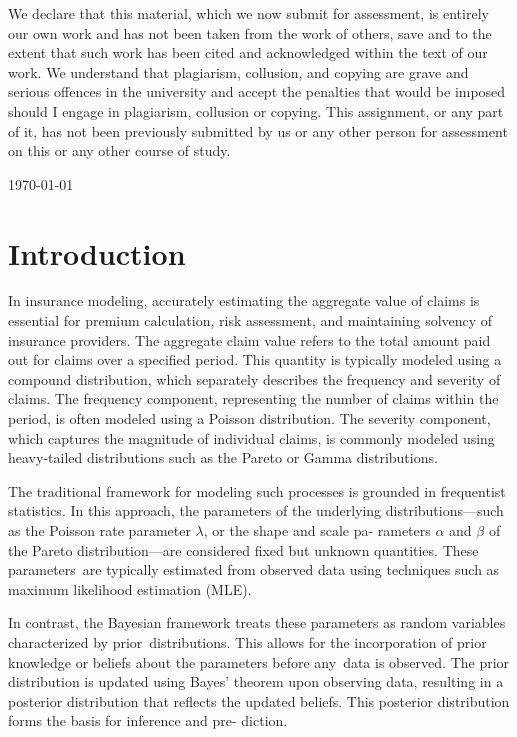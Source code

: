 \documentclass{Class/julia}
\begin{document}
\begin{titlepage}
\begin{center}
\begin{figure}[h!]
\end{figure}
\end{center}
\vfill
\begin{center}
{\small{We declare that this material, which we now submit for assessment, is entirely our own work and has not been taken from the work of others, save and to the extent that such work has been cited and acknowledged within the text of our work. We understand that plagiarism, collusion, and copying are grave and serious offences in the university and accept the penalties that would be imposed should I engage in plagiarism, collusion or copying. This assignment, or any part of it, has not been previously submitted by us or any other person for assessment on this or any other course of study.}}
\end{center}
\vfill
    {\large \today \par}
    \vfill
\end{titlepage}

\tableofcontents

\section{Introduction}

In insurance modeling, accurately estimating the aggregate value of claims is essential for premium calculation, risk assessment, and maintaining solvency of insurance providers. The aggregate claim value refers to the total amount paid out for claims over a specified period. This quantity is typically modeled using a compound distribution, which separately describes the frequency and severity of claims. The frequency component, representing the number of claims within the period, is often modeled using a Poisson distribution. The severity component, which captures the magnitude of individual claims, is commonly modeled using heavy-tailed distributions such as the Pareto or Gamma distributions.

The traditional framework for modeling such processes is grounded in frequentist statistics. In this approach, the parameters of the underlying distributions—such as the Poisson rate parameter \( \lambda \), or the shape and scale pa- rameters \( \alpha \) and \( \beta \) of the Pareto distribution—are considered fixed but unknown quantities. These parameters~are typically estimated from observed data using techniques such as maximum likelihood estimation (MLE).

In contrast, the Bayesian framework treats these parameters as random variables characterized by prior~distributions. This allows for the incorporation of prior knowledge or beliefs about the parameters before any~data is observed. The prior distribution is updated using Bayes' theorem upon observing data, resulting in a posterior distribution that reflects the updated beliefs. This posterior distribution forms the basis for inference and pre- diction.
\end{document}
